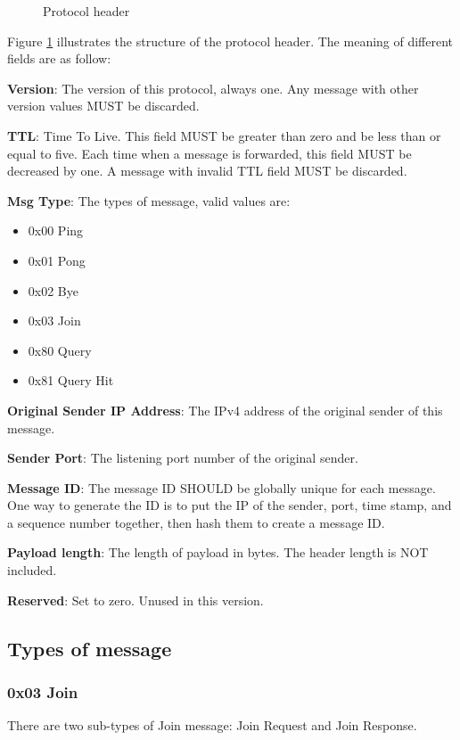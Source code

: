 \documentclass[12pt, a4paper]{article}
\begin{document}
\begin{figure}[h!]
  \centering
  \theverbbox
  \caption{Protocol header}
  \label{fig:header}
\end{figure}

Figure \ref{fig:header} illustrates the structure of the protocol header.
The meaning of different fields are as follow:

\textbf{Version}: The version of this protocol, always one.
Any message with other version values MUST be discarded.

\textbf{TTL}: Time To Live.
This field MUST be greater than zero and be less than or equal to five.
Each time when a message is forwarded, this field MUST be decreased by one.
A message with invalid TTL field MUST be discarded.

\textbf{Msg Type}: The types of message, valid values are:
\begin{itemize}
\item 0x00 Ping
\item 0x01 Pong
\item 0x02 Bye
\item 0x03 Join
\item 0x80 Query
\item 0x81 Query Hit
\end{itemize}

\textbf{Original Sender IP Address}: The IPv4 address of the original sender of this message.

\textbf{Sender Port}: The listening port number of the original sender.

\textbf{Message ID}: The message ID SHOULD be globally unique for each message. 
One way to generate the ID is to put the IP of the sender, port, time stamp, and a sequence number together, then hash them to create a message ID.

\textbf{Payload length}: The length of payload in bytes.
The header length is NOT included.

\textbf{Reserved}: Set to zero. Unused in this version.

\subsection{Types of message}
\subsubsection{0x03 Join}
There are two sub-types of Join message: Join Request and Join Response.
\end{document}
